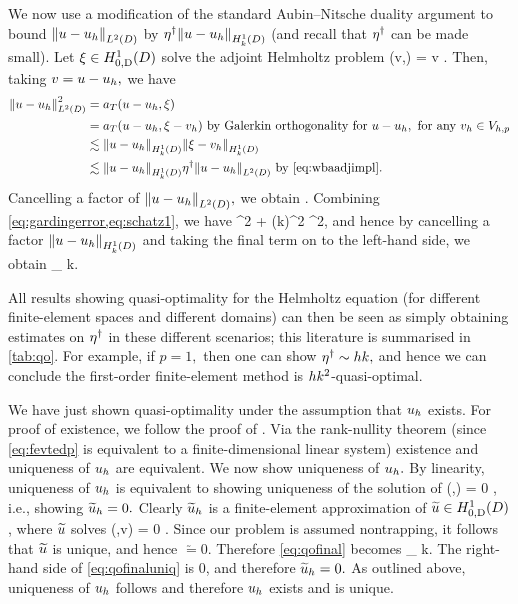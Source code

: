 We now use a modification of the standard Aubin--Nitsche duality argument to bound $\NLtD{u-\uh}$ by $\wbaadj \NHokD{u-\uh}$ (and recall that $\eta^{\dagger}$ can be made small). Let $\xi \in \HozDD$ solve the adjoint Helmholtz problem
\beq\label{eq:xidef}
\aT(v,\xi) =  \tforall v \in \HozDD.
\eeq
Then, taking $v = u-u_{h},$ we have
\begin{align}
  \NLtD{u-\uh}^2 &= \aT(u-\uh,\xi)\label{eq:schatz0}\\
  &=\aT(u-\uh,\xi - \vh) \text{ by Galerkin orthogonality for } u-\uh, \text{ for any } \vh \in \Vhp\nonumber\\
  &\lesssim \NHokD{u-\uh}\NHokD{\xi-\vh}\nonumber\\
  &\lesssim \NHokD{u-\uh} \wbaadj \NLtD{u-\uh}\text{ by \cref{eq:wbaadjimpl}.}\nonumber
\end{align}
Cancelling a factor of $\NLtD{u-\uh},$ we obtain
\beq\label{eq:schatz1}
 \lesssim \wbaadj {}.
\eeq
Combining \cref{eq:gardingerror,eq:schatz1}, we have
\beqs
{}^2 \lesssim {} + \mleft(k\wbaadj\mright)^2 ^2,
\eeqs
and hence by cancelling a factor $\NHokD{u-\uh}$ and taking the final term on to the left-hand side, we obtain
\beq\label{eq:qofinal}
 \lesssim \inf_{\vh \in \Vhp}  \tif k\wbaadj {}.
\eeq

All results showing quasi-optimality for the Helmholtz equation (for different finite-element spaces and different domains) can then be seen as simply obtaining estimates on $\eta^{\dagger}$ in these different scenarios; this literature is summarised in \cref{tab:qo}. For example, if $p=1,$ then one can show $\eta^{\dagger} \sim hk,$ and hence we can conclude the first-order finite-element method is $hk^{2}$-quasi-optimal.

We have just shown quasi-optimality under the assumption that $u_{h}$ exists. For proof of existence, we follow the proof of \cite[Theorem 5.21]{Sp:15}. Via the rank-nullity theorem (since \cref{eq:fevtedp} is equivalent to a finite-dimensional linear system) existence and uniqueness of $u_{h}$ are equivalent. We now show uniqueness of $u_{h}.$ By linearity, uniqueness of $u_{h}$ is equivalent to showing uniqueness of the solution of
\beqs\label{eq:uniqproof}
\aT\mleft(\uhtilde,\vh\mright) = 0 \tforall \vh \in \Vhp,
\eeqs
i.e., showing $\widetilde{u}_{h} = 0.$ Clearly $\widetilde{u}_{h}$ is a finite-element approximation of $\utilde \in \HozDD$, where $\widetilde{u}$ solves
\beqs
\aT\mleft(\utilde,v\mright) = 0 \tforall \vh \in \HozDD.
\eeqs
Since our problem is assumed nontrapping, it follows that $\widetilde{u}$ is unique, and hence $\utilde = 0$. Therefore \cref{eq:qofinal} becomes
\beq\label{eq:qofinaluniq}
\NHokD{\uhtilde} \lesssim \inf_{\vh \in \Vhp} \NHokD{\vh} \tif k\wbaadj {}.
\eeq
The right-hand side of \cref{eq:qofinaluniq} is 0, and therefore $\widetilde{u}_{h}=0.$ As outlined above, uniqueness of $u_{h}$ follows and therefore $u_{h}$ exists and is unique.

